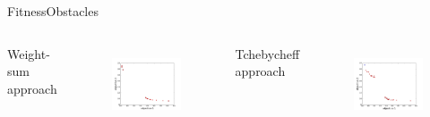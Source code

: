 \begin{frame}{Fitness}{Obstacles}
\begin{columns}
	{ Weight-sum approach}
	\begin{figure}
		\centering
		\includegraphics[width=\linewidth]{figure/sim4-obstacle/PF04-MORRT.png}
		\label{fig:sim:02:fit1}
	\end{figure}
	{ Tchebycheff approach}
	\begin{figure}
		\centering
		\includegraphics[width=\linewidth]{figure/sim5-obstacle/PF05-MORRT2.png}
		\label{fig:sim:02:fit2}
	\end{figure}
\end{columns}
\end{frame}

